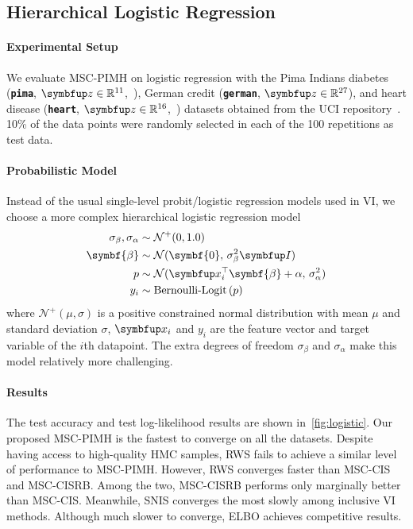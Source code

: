 \subsection{Hierarchical Logistic Regression}\label{section:logistic}
\vspace{-0.05in}
\paragraph{Experimental Setup}
We evaluate MSC-PIMH on logistic regression with the Pima Indians diabetes (\textbf{\texttt{pima}}, \(\vz \in \mathbb{R}^{11}\),~\citealt{smith_using_1988}), German credit (\textbf{\texttt{german}}, \(\vz \in \mathbb{R}^{27}\)), and heart disease (\textbf{\texttt{heart}}, \(\vz \in \mathbb{R}^{16}\),~\citealt{detrano_international_1989}) datasets obtained from the UCI repository~\citep{Dua:2019}.
10\% of the data points were randomly selected in each of the 100 repetitions as test data.

\vspace{-0.1in}
\paragraph{Probabilistic Model}
Instead of the usual single-level probit/logistic regression models used in VI, we choose a more complex hierarchical logistic regression model 
%
\begin{align*}
\sigma_{\beta}, \sigma_{\alpha} &\sim \mathcal{N}^{+}(0, 1.0) \\
\symbf{\beta} &\sim \mathcal{N}(\symbf{0},\, \sigma_{\beta}^2 \mI) \\
p &\sim \mathcal{N}(\vx_i^{\top}\symbf{\beta} + \alpha,\, \sigma_{\alpha}^2) \\
y_i &\sim \text{Bernoulli-Logit}\,(p)
\end{align*}
%
where \(\mathcal{N}^+(\mu, \sigma)\) is a positive constrained normal distribution with mean \(\mu\) and standard deviation \(\sigma\), \(\vx_i\) and \(y_i\) are the feature vector and target variable of the \(i\)th datapoint.
The extra degrees of freedom \(\sigma_{\beta}\) and \(\sigma_{\alpha}\) make this model relatively more challenging.

\paragraph{Results}
The test accuracy and test log-likelihood results are shown in~\cref{fig:logistic}.
Our proposed MSC-PIMH is the fastest to converge on all the datasets.
Despite having access to high-quality HMC samples, RWS fails to achieve a similar level of performance to MSC-PIMH.
However, RWS converges faster than MSC-CIS and MSC-CISRB.
Among the two, MSC-CISRB performs only marginally better than MSC-CIS.
Meanwhile, SNIS converges the most slowly among inclusive VI methods.
Although much slower to converge, ELBO achieves competitive results.

